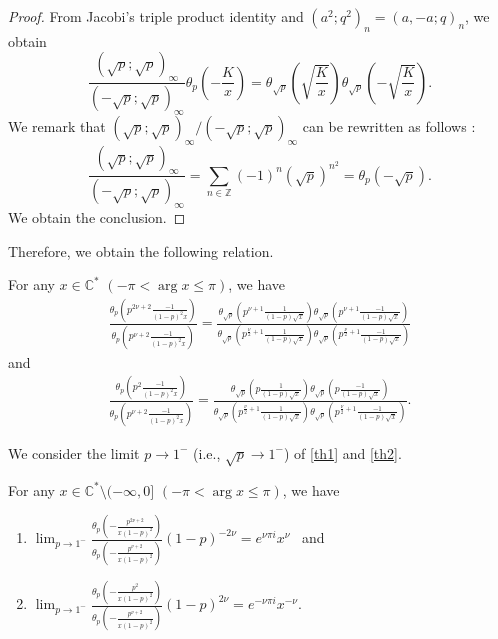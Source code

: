 \documentclass[pdftex]{sigma}
\begin{document}
\begin{proof}From Jacobi's triple product identity and $(a^2;q^2)_n=(a,-a;q)_n$, we obtain
\[\frac{(\sqrt{p};\sqrt{p})_\infty}{(-\sqrt{p};\sqrt{p})_\infty}\theta_p\left(-\frac{K}{x}\right)
=\theta_{\sqrt{p}}\left(\sqrt{\frac{K}{x}}\right)\theta_{\sqrt{p}}\left(-\sqrt{\frac{K}{x}}\right).\]
We remark that $(\sqrt{p};\sqrt{p})_\infty /(-\sqrt{p};\sqrt{p})_\infty$ can be rewritten as follows \cite{GR}:
\[\frac{(\sqrt{p};\sqrt{p})_\infty}{(-\sqrt{p};\sqrt{p})_\infty}
=\sum_{n\in\mathbb{Z}}(-1)^n(\sqrt{p})^{n^2}=\theta_p(-\sqrt{p}).\]
We obtain the conclusion.
\end{proof}
Therefore, we obtain the following relation.
\begin{corollary}\label{kei2}For any $x\in\mathbb{C}^*$ $(-\pi <\arg x\leq\pi )$, we have
\begin{gather}
\frac{\theta_p\left(p^{2\nu +2}\frac{-1}{(1-p)^2x}\right)}{\theta_p\left(p^{\nu +2}\frac{-1}{(1-p)^2x}\right)}
=\frac{\theta_{\sqrt{p}}\left(p^{\nu +1}\frac{1}{(1-p)\sqrt{x}}\right) \theta_{\sqrt{p}}\left(p^{\nu +1}\frac{-1}{(1-p)\sqrt{x}}\right)}
{\theta_{\sqrt{p}}\left(p^{\frac{\nu}{2}+1}\frac{1}{(1-p)\sqrt{x}}\right)\theta_{\sqrt{p}}
\left(p^{\frac{\nu}{2}+1}\frac{-1}{(1-p)\sqrt{x}}\right)}\label{th1}
\end{gather}
and
\begin{gather}
\frac{\theta_p\left(p^2\frac{-1}{(1-p)^2x}\right)}{\theta_p\left(p^{\nu +2}\frac{-1}{(1-p)^2x}\right)}
=\frac{\theta_{\sqrt{p}}\left(p\frac{1}{(1-p)\sqrt{x}}\right)\theta_{\sqrt{p}}\left(p\frac{-1}{(1-p)\sqrt{x}}\right)}
{\theta_{\sqrt{p}}\left(p^{\frac{\nu}{2}+1}\frac{1}{(1-p)\sqrt{x}}\right)\theta_{\sqrt{p}}\left(p^{\frac{\nu}{2}+1}\frac{-1}{(1-p)\sqrt{x}}\right)}.\label{th2}
\end{gather}
\end{corollary}
We consider the limit $p\to 1^-$ (i.e., $\sqrt{p}\to 1^-$) of \eqref{th1} and \eqref{th2}.
\begin{lemma}For any $x\in\mathbb{C}^*\setminus (-\infty ,0]$ $(-\pi <\arg x\leq\pi )$, we have
\label{limthe}
\begin{enumerate}\itemsep=0pt
\item[$1.$] $\displaystyle{\lim_{p\to 1^-}\frac{\theta_p\left(-\frac{p^{2\nu +2}}{x(1-p)^2}\right)}
{\theta_p\left(-\frac{p^{\nu +2}}{x(1-p)^2}\right)}(1-p)^{-2\nu}=e^{\nu \pi i}x^\nu}$ \
and
\item[$2.$] \label{limtheta}$\displaystyle{\lim_{p\to 1^-}\frac{\theta_p\left(-\frac{p^{2}}{x(1-p)^2}\right)}
{\theta_p\left(-\frac{p^{\nu +2}}{x(1-p)^2}\right)}(1-p)^{2\nu}=e^{-\nu \pi i}x^{-\nu}}$.
\end{enumerate}
\end{lemma}
\end{document}

